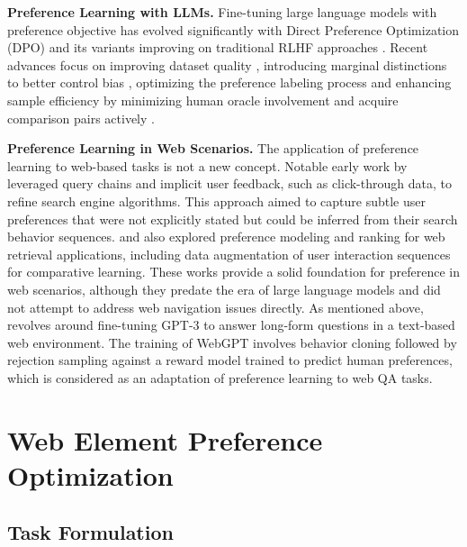 \documentclass{article}
\begin{document}
  
  \textbf{Preference Learning with LLMs.} Fine-tuning large language models with preference objective has evolved significantly with Direct Preference Optimization (DPO) \citep{rafailov2024direct} and its variants \citep{hong2024orpo,meng2024simpo,morimura2024filtered,amini2024direct} improving on traditional RLHF approaches \citep{christiano2017deep,ziegler2019fine,stiennon2020learning,ouyang2022training}. Recent advances focus on improving dataset quality \citep{morimura2024filtered}, introducing marginal distinctions to better control bias \citep{duan2024negating}, optimizing the preference labeling process and enhancing sample efficiency by minimizing human oracle involvement \citep{bai2022constitutional} and acquire comparison pairs actively \citep{muldrew2024active}.
  
  \textbf{Preference Learning in Web Scenarios.} The application of preference learning to web-based tasks is not a new concept. Notable early work by \citet{radlinski2005query} leveraged query chains and implicit user feedback, such as click-through data, to refine search engine algorithms. This approach aimed to capture subtle user preferences that were not explicitly stated but could be inferred from their search behavior sequences. \citet{xiang2010context} and \citet{zhu2021contrastive} also explored preference modeling and ranking for web retrieval applications, including data augmentation of user interaction sequences for comparative learning. These works provide a solid foundation for preference in web scenarios, although they predate the era of large language models and did not attempt to address web navigation issues directly. As mentioned above, \citet{nakano2021webgpt} revolves around fine-tuning GPT-3 \citep{brown2020language} to answer long-form questions in a text-based web environment. The training of WebGPT involves behavior cloning followed by rejection sampling against a reward model trained to predict human preferences, which is considered as an adaptation of preference learning to web QA tasks.

  \section{Web Element Preference Optimization}

  \subsection{Task Formulation}
  
\end{document}
